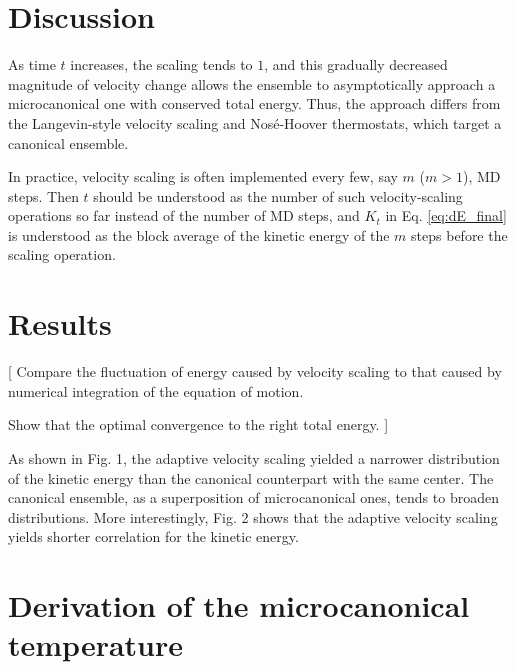 \documentclass[reprint]{revtex4-1}
\begin{document}
\section{Discussion}


As time $t$ increases, the scaling tends to $1$,
and this gradually decreased magnitude of velocity change
allows the ensemble to asymptotically approach a
microcanonical one with conserved total energy.
%
Thus, the approach differs from the Langevin-style
velocity scaling and Nos\'e-Hoover thermostats,
which target a canonical ensemble.


In practice, velocity scaling is often implemented every few,
say $m$ ($m > 1$), MD steps.
%
Then $t$ should be understood as the number of
such velocity-scaling operations so far instead of
the number of MD steps, and $K_t$ in Eq. \eqref{eq:dE_final} is understood
as the block average of the kinetic energy of the $m$ steps
before the scaling operation.


\section{Results}


[
Compare the fluctuation of energy caused by velocity scaling to
that caused by numerical integration of the equation of motion.


Show that the optimal convergence to the right total energy.
]

As shown in Fig. 1,
the adaptive velocity scaling yielded a narrower distribution
of the kinetic energy than the canonical counterpart
with the same center.
%
The canonical ensemble, as a superposition
of microcanonical ones,
tends to broaden distributions.
%
More interestingly,
Fig. 2 shows that the adaptive velocity scaling
yields shorter correlation for the kinetic energy.

\appendix


\section{Derivation of the microcanonical temperature}
\end{document}
